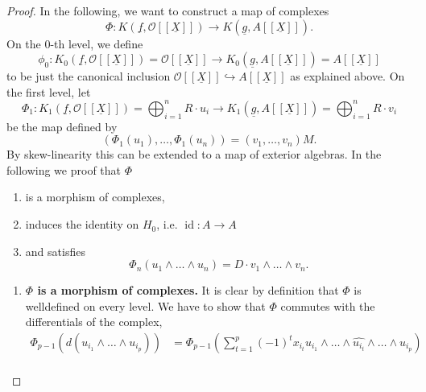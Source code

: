 \documentclass{article}
\theoremstyle{plain}%
\theoremstyle{definition}
\theoremstyle{remark}
\begin{document}
\begin{proof}
        In the following, we want to construct a map of complexes
        \[\Phi\colon K(\underline{f}, \mathcal{O}[[\underline{X}]]) \to K(\underline{g}, A[[\underline{X}]]).\]
        On the 0-th level, we define 
        \[
            \phi_0 \colon K_0(\underline{f}, \mathcal{O}[[\underline{X}]]) = \mathcal{O}[[\underline{X}]] 
            \to 
            K_0(\underline{g}, A[[\underline{X}]]) = A[[\underline{X}]]
        \]
        to be just the canonical inclusion \(\mathcal{O}[[\underline{X}]] \hookrightarrow A[[\underline{X}]]\)
        as explained above.
        On the first level, let
        \[
            \Phi_1 \colon 
                K_1(\underline{f}, \mathcal{O}[[\underline{X}]]) = \bigoplus_{i = 1}^n R \cdot u_i
                \to 
                K_1(\underline{g}, A[[\underline{X}]]) = \bigoplus_{i=1}^n R \cdot v_i
        \]
        be the map defined by
        \[
            (\Phi_1(u_1), \dots, \Phi_1(u_n)) = (v_1, \dots, v_n)M. %
        \]
        By skew-linearity this can be extended to a map of exterior algebras. %
        In the following we proof that \(\Phi\)
        \begin{enumerate}
            \item is a morphism of complexes,
            \item induces the identity on \(H_0\), i.e. \(\operatorname{id}\colon A \to A\)
            \item and satisfies
            \[
                \Phi_n(u_1 \wedge \dots \wedge u_n) = D \cdot v_1 \wedge \dots \wedge v_n.  
            \]
        \end{enumerate}
        \begin{enumerate}
            \item \textbf{\(\Phi\) is a morphism of complexes.}
            It is clear by definition that \(\Phi\) is welldefined on every level.
            We have to show that \(\Phi\) commutes with the differentials of the complex,
            \begin{align*}
                \Phi_{p-1}(d(u_{i_1}\!\wedge\!\dots\!\wedge\!u_{i_p})) 
                &= \Phi_{p-1}\left(\sum_{t=1}^p(-1)^t x_{i_t} 
                u_{i_1}\!\wedge\!\dots\!\wedge\!\widehat{u_{i_t}}\!\wedge\!\dots\!\wedge\!u_{i_p}\right)\\

\end{align*}
\end{enumerate}
\end{proof}
\end{document}
